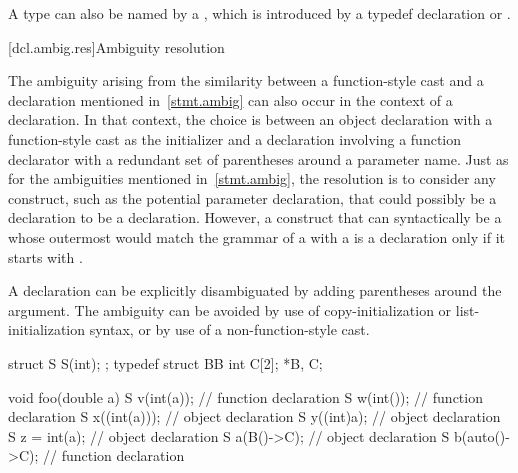\pnum
\begin{note}
A type can also be named by a ,
which is introduced by a typedef declaration
or .
\end{note}

[dcl.ambig.res]{Ambiguity resolution}%
%

\pnum
The ambiguity arising from the similarity between a function-style cast and
a declaration mentioned in~\ref{stmt.ambig} can also occur in the context of a declaration.
In that context, the choice is between
an object declaration
with a function-style cast as the initializer and
a declaration involving a function declarator
with a redundant set of parentheses around a parameter name.
Just as for the ambiguities mentioned in~\ref{stmt.ambig},
the resolution is to consider any construct,
such as the potential parameter declaration,
that could possibly be a declaration
to be a declaration.
However, a construct that can syntactically be a 
whose outermost 
would match the grammar of a 
with a 
is a declaration only if it starts with .
\begin{note}
A declaration can be explicitly disambiguated by adding parentheses
around the argument.
The ambiguity can be avoided by use of copy-initialization or
list-initialization syntax, or by use of a non-function-style cast.
\end{note}
\begin{example}
\begin{codeblock}
struct S {
  S(int);
};
typedef struct BB { int C[2]; } *B, C;

void foo(double a) {
  S v(int(a));                  // function declaration
  S w(int());                   // function declaration
  S x((int(a)));                // object declaration
  S y((int)a);                  // object declaration
  S z = int(a);                 // object declaration
  S a(B()->C);                  // object declaration
  S b(auto()->C);               // function declaration
}
\end{codeblock}
\end{example}

